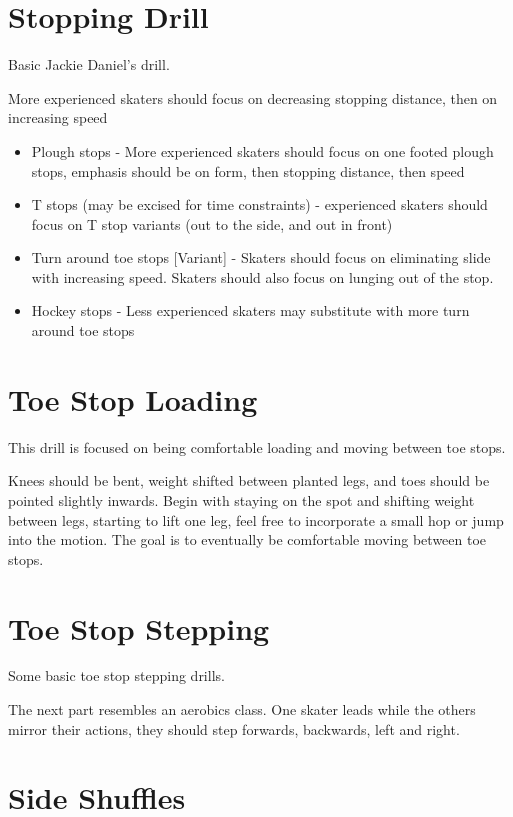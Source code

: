 \documentclass{journal}
\begin{document}
\section*{Stopping Drill}
\label{drill:stopping:jackie_daniels}
Basic Jackie Daniel's drill.

More experienced skaters should focus on decreasing stopping distance, then on increasing speed

\begin{itemize}
    \item Plough stops - More experienced skaters should focus on one footed plough stops, emphasis should be on form, then stopping distance, then speed 
    \item T stops (may be excised for time constraints) - experienced skaters should focus on T stop variants (out to the side, and out in front)  
    \item Turn around toe stops [Variant] - Skaters should focus on eliminating slide with increasing speed. Skaters should also focus on lunging out of the stop.  
    \item Hockey stops - Less experienced skaters may substitute with more turn around toe stops 
\end{itemize}


\section*{Toe Stop Loading}
\label{drill:toe_stop:loading}

This drill is focused on being comfortable loading and moving between toe stops. 

Knees should be bent, weight shifted between planted legs, and toes should be pointed slightly inwards. 
Begin with staying on the spot and shifting weight between legs, starting to lift one leg, feel free to incorporate a small hop or jump into the motion.
The goal is to eventually be comfortable moving between toe stops. 


\section*{Toe Stop Stepping}
\label{drill:toe_stop_stepping}
Some basic toe stop stepping drills.

The next part resembles an aerobics class.
One skater leads while the others mirror their actions, they should step forwards, backwards, left and right.


\section*{Side Shuffles}
\label{drill:toe_stop:side_shuffles}
\end{document}
